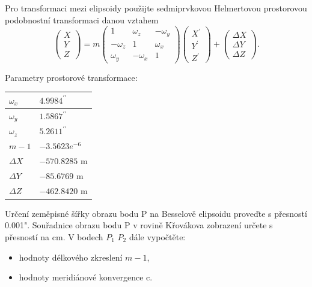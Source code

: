 \documentclass[12pt, a4paper]{article}
\begin{document}
Pro transformaci mezi elipsoidy použijte sedmiprvkovou Helmertovou prostorovou podobnostní transformaci danou vztahem
\begin{equation*}
\begin{pmatrix} X \\ Y \\ Z \end{pmatrix} = m \begin{pmatrix} 1 & \omega_{z} & -\omega_{y} \\ -\omega_{z} & 1 & \omega_{x} \\ \omega_{y} & -\omega_{x} & 1 \end{pmatrix} \begin{pmatrix} X^{\prime} \\ Y^{\prime} \\ Z^{\prime} \end{pmatrix} + \begin{pmatrix} \Delta X \\ \Delta Y \\ \Delta Z \end{pmatrix}.
\end{equation*}

Parametry prostorové transformace:

\vspace{1em}
\begin{center}
\begin{tabular}{|l|l|}
\hline
$\omega_{x}$ & $4.9984^{\prime\prime}$ \\ \hline
$\omega_{y}$ & $1.5867^{\prime\prime}$ \\ \hline
$\omega_{z}$ & $5.2611^{\prime\prime}$ \\ \hline
$m-1$ & $-3.5623e^{-6}$ \\ \hline
$\Delta X$ & $-570.8285$ m \\ \hline
$\Delta Y$ & $-85.6769$ m \\ \hline
$\Delta Z$ & $-462.8420$ m \\ \hline
\end{tabular}
\end{center}
\vspace{1em}

Určení zeměpisné šířky obrazu bodu P na Besselově elipsoidu proveďte s přesností 0.001". Souřadnice obrazu bodu P v rovině Křovákova zobrazení určete s přesností na cm. V bodech $P_{1}$ $P_{2}$ dále vypočtěte:

\begin{itemize}
    \item hodnoty délkového zkreslení $m-1$,
    \item hodnoty meridiánové konvergence c.
\end{itemize}
\end{document}
